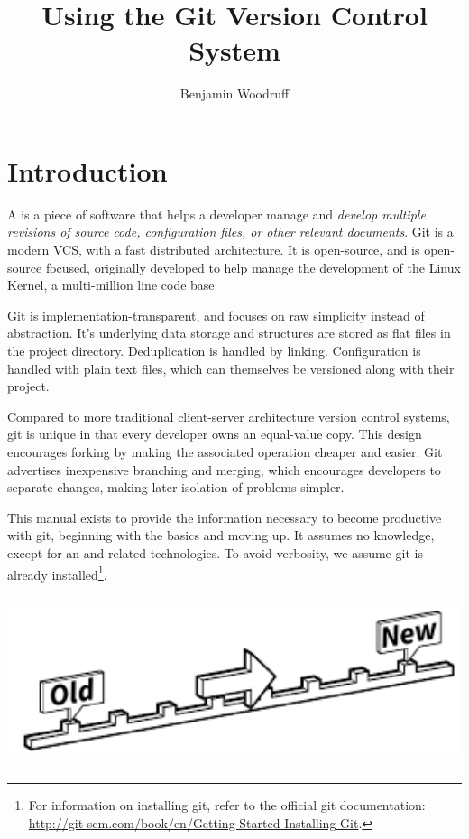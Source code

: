 \documentclass[11pt,letterpaper,twoside]{report}
\title{Using the Git Version Control System}
\author{Benjamin Woodruff}
\begin{document}
\maketitle
\maketoc

\chapter{Introduction}

A  is a piece of software that helps a
developer manage and \emph{develop multiple revisions of source code,
configuration files, or other relevant documents}. Git is a modern VCS, with a
fast distributed architecture. It is open-source, and is open-source focused,
originally developed to help manage the development of the Linux Kernel, a
multi-million line code base.

Git is implementation-transparent, and focuses on raw simplicity instead of
abstraction. It's underlying data storage and structures are stored as flat
files in the project directory. Deduplication is handled by linking.
Configuration is handled with plain text files, which can themselves be
versioned along with their project.

Compared to more traditional client-server architecture version control systems,
git is unique in that every developer owns an equal-value copy. This design
encourages forking by making the associated operation cheaper and easier. Git
advertises inexpensive branching and merging, which encourages developers to
separate changes, making later isolation of problems simpler.

This manual exists to provide the information necessary to become productive
with git, beginning with the basics and moving up. It assumes no knowledge,
except for an  and related technologies.
To avoid verbosity, we assume git is already installed\footnote{For information
on installing git, refer to the official git documentation:
\url{http://git-scm.com/book/en/Getting-Started-Installing-Git}.}.

\vspace{\fill}
\begin{center}
\includegraphics[height=5cm]{resources/timeline_abstract.pdf}
\end{center}
\vspace*{\fill}
\end{document}
